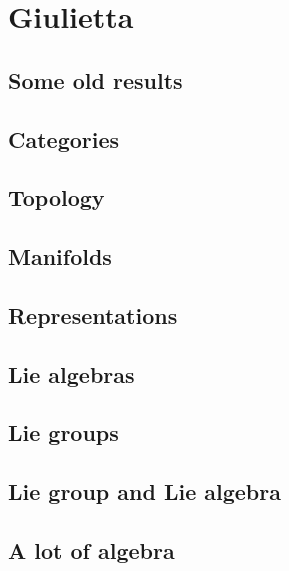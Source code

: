 \documentclass[a4paper,twoside,11pt]{book}
\begin{document}
\part{Giulietta}

\chapter{Some old results}


\chapter{Categories}        \label{chap_category}


\chapter{Topology}              \label{chap_topology}



\chapter{Manifolds} \label{Chapitre_FB}





\chapter{Representations}


\chapter{Lie algebras}







\chapter{Lie groups}


\chapter{Lie group and Lie algebra}




\chapter{A lot of algebra}



\end{document}
